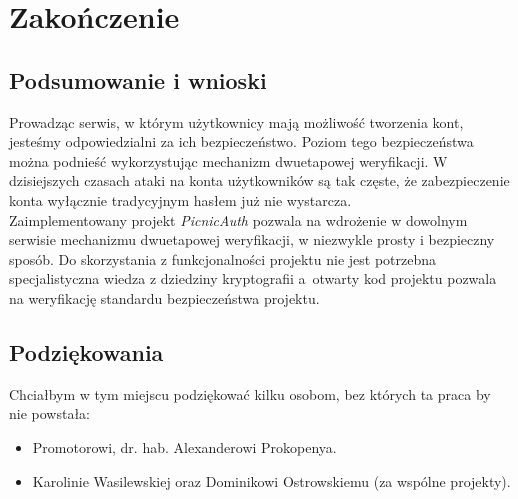 \chapter{Zakończenie}

\section{Podsumowanie i wnioski}
Prowadząc serwis, w którym użytkownicy mają możliwość tworzenia kont, jesteśmy odpowiedzialni za ich bezpieczeństwo. 
Poziom tego bezpieczeństwa można podnieść wykorzystując mechanizm dwuetapowej weryfikacji. 
W dzisiejszych czasach ataki na konta użytkowników są tak częste, że zabezpieczenie konta wyłącznie tradycyjnym hasłem już nie wystarcza. \\
Zaimplementowany projekt \textit{PicnicAuth} pozwala na wdrożenie w dowolnym serwisie mechanizmu dwuetapowej weryfikacji, 
w niezwykle prosty i bezpieczny sposób. 
Do skorzystania z funkcjonalności projektu nie jest potrzebna specjalistyczna wiedza z dziedziny kryptografii 
a~otwarty kod projektu pozwala na weryfikację standardu bezpieczeństwa projektu.

\section{Podziękowania}
Chciałbym w tym miejscu podziękować kilku osobom, bez których ta praca by nie powstała:
\begin{itemize}
	\item Promotorowi, dr. hab. Alexanderowi Prokopenya.
	\item Karolinie Wasilewskiej oraz Dominikowi Ostrowskiemu (za wspólne projekty).
\end{itemize} 